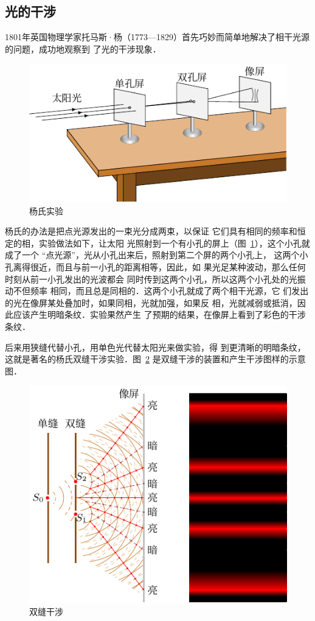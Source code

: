 \subsection{光的干涉}

1801年英国物理学家托马斯·杨（1773—1829）首先巧妙而简单地解决了相干光源的问题，成功地观察到
了光的干涉现象．
\begin{figure}[htbp]
    \centering
    \includegraphics{fig/C/6-1.pdf}
    \caption{杨氏实验}\label{fig_C_6-1}
\end{figure}

杨氏的办法是把点光源发出的一束光分成两束，以保证
它们具有相同的频率和恒定的相，实验做法如下，让太阳
光照射到一个有小孔的屏上（图~\ref{fig_C_6-1}），这个小孔就成了一个
“点光源”，光从小孔出来后，照射到第二个屏的两个小孔上，
这两个小孔离得很近，而且与前一小孔的距离相等，因此，如
果光足某种波动，那么任何时刻从前一小孔发出的光波都会
同时传到这两个小孔，所以这两个小孔处的光振动不但频率
相同，而且总是同相的．这两个小孔就成了两个相干光源，它
们发出的光在像屏某处叠加时，如果同相，光就加强，如果反
相，光就减弱或抵消，因此应该产生明暗条纹．实验果然产生
了预期的结果，在像屏上看到了彩色的干涉条纹．

后来用狭缝代替小孔，用单色光代替太阳光来做实验，得
到更清晰的明暗条纹，这就是著名的杨氏双缝干涉实验．图~\ref{fig_C_6-2} 
是双缝干涉的装置和产生干涉图样的示意图．
\begin{figure}[htbp]
    \centering
    \includegraphics{fig/C/6-2.pdf}
    \caption{双缝干涉}\label{fig_C_6-2}
\end{figure}


